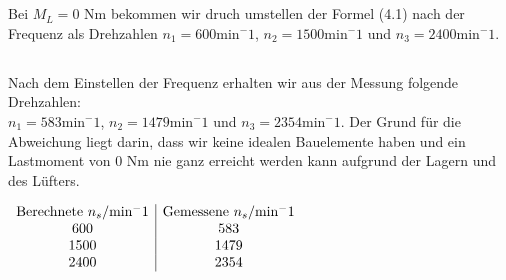 \chapter{}\label{ex:aufg5}
%
\section{}\label{sec:aufg5a}
%
Bei $M_L = 0$ Nm bekommen wir druch umstellen der Formel (4.1) nach der Frequenz als Drehzahlen $n_1 = 600 \text{min}^-1$, $n_2 = 1500 \text{min}^-1$ und $n_3 = 2400 \text{min}^-1$.
\section{}\label{sec:aufg5b}
%
Nach dem Einstellen der Frequenz erhalten wir aus der Messung folgende Drehzahlen:\\
$n_1 = 583 \text{min}^-1$, $n_2 = 1479 \text{min}^-1$ und $n_3 = 2354 \text{min}^-1$.
Der Grund für die Abweichung liegt darin, dass wir keine idealen Bauelemente haben und ein Lastmoment von 0 Nm nie ganz erreicht werden kann aufgrund der Lagern und des Lüfters.

$\begin{array}{c | c}
	\text{Berechnete}~n_s/\text{min}^-1 & \text{Gemessene} ~n_s/\text{min}^-1\\
	 600 &  583 \\ 
	1500 & 1479 \\ 
	2400 & 2354
\end{array} $
